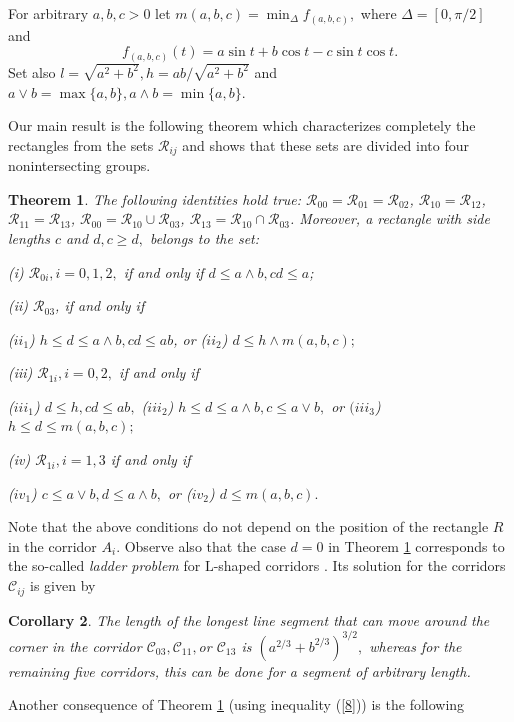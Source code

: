 \documentclass[12pt]{amsart}
\newtheorem{thm}{Theorem}
\newtheorem{cor}[thm]{Corollary}
\def\C{\mathcal C}
\def\R{\mathcal R}
\def\DD{\Delta}
\def\s{\smallskip}
\def\w{\wedge}
\begin{document}
\s

For arbitrary $a,b,c>0$ let $m(a,b,c)=\min_\DD
f_{(a,b,c)},$ where $\DD =[0,\pi/2]$ and
\begin{equation}\label{1}
f_{(a,b,c)}(t)=a\sin t+b\cos t-c\sin t\cos t.
\end{equation}
Set also $l=\sqrt{a^2+b^2}, h=ab/\sqrt{a^2+b^2}$ and $ a\vee
b=\max\{a,b\}, a\w b=\min\{a,b\}.$

Our main result is the following theorem which characterizes
completely the rectangles from the sets $\R_{ij}$ and shows that
these sets are divided into four nonintersecting groups.

\begin{thm} \label{t1} The following identities hold true: $\R_{00}=\R_{01}=\R_{02}$,
$\R_{10}=\R_{12}$, $\R_{11}=\R_{13}$, $\R_{00}=\R_{10}\cup\R_{03}$,
$\R_{13}=\R_{10}\cap\R_{03}$. Moreover, a rectangle with side
lengths $c$ and $d , c\ge d , $ belongs to the set:

(i) $\R_{0i}, i=0,1,2,$ if and only if $d\le a\w b, cd\le
a$;


(ii) $\R_{03}$, if and only if

($ii_1$) $h \le d\le a\w b, cd\le ab$, or ($ii_2$) $d\le h\w
m(a,b,c);$

(iii) $\R_{1i}, i=0,2,$ if and only if

($iii_1$) $d\le h, cd\le ab,$ ($iii_2$) $h\le d\le a\w b,
c\le a\vee b,$ or $(iii_3$) $h\le d\le m(a,b,c);$

(iv) $\R_{1i}, i=1,3$ if and only if

($iv_1$) $c\le a\vee b, d\le a\w b,$ or ($iv_2$) $d\le
m(a,b,c).$
\end{thm}

Note that the above conditions do not depend on the position of
the rectangle $R$ in the corridor $A_i$. Observe also  that the
case $d=0$ in Theorem \ref{t1} corresponds to the so-called
\emph{ladder problem} for $\mathrm{L}$-shaped corridors \cite{Ka}.
Its solution for the corridors $\C_{ij}$ is given by

\s

\begin{cor} \label{cr1} The length of the longest line segment that can move
around the corner in the corridor $\C_{03} , \C_{11} ,$or
$\C_{13}$ is $(a^{2/3}+b^{2/3})^{3/2},$ whereas for the remaining
five corridors, this can be done for a segment of arbitrary
length.
\end{cor}

Another consequence of Theorem \ref{t1} (using inequality
(\ref{8})) is the following
\end{document}
